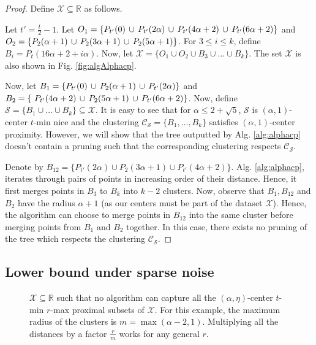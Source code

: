 \documentclass[anon,12pt]{colt2016} %
\newcommand{\mc}{\mathcal}
\begin{document}
\begin{proof}
Define $\mc X \subseteq \mathbb{R}$ as follows. 

Let $t' = \frac{t}{2}-1$. Let $O_1 = \{P_{t'}(0) \thinspace\cup\thinspace P_{t'}(2\alpha) \thinspace\cup\thinspace P_{t'}(4\alpha+2) \thinspace\cup\thinspace P_{t'}(6\alpha+2)\}$ and $O_2 = \{P_{2}(\alpha+1) \thinspace\cup\thinspace P_{2}(3\alpha+1) \thinspace\cup\thinspace P_{2}(5\alpha+1) \}$. For $3\le i\le k$, define $B_i = P_t (16\alpha+2+i \alpha )$. Now, let $\mc X = \{ O_1 \cup O_2 \cup B_3 \cup \ldots \cup B_k \}$. The set $\mc X$ is also shown in Fig. \ref{fig:algAlphacp}.

Now, let $B_1 = \{P_{t'}(0) \thinspace\cup\thinspace  P_{2}(\alpha+1) \thinspace\cup\thinspace P_{t'}(2\alpha) \}$ and $B_2 = \{\ P_{t'}(4\alpha+2) \thinspace\cup\thinspace P_{2}(5\alpha+1)\thinspace\cup\thinspace P_{t'}(6\alpha+2)\}$. Now, define $\mc S = \{B_1 \cup \ldots \cup B_k\} \subseteq \mc X$. It is easy to see that for $\alpha \le 2+\sqrt{5}$, $\mc S$ is $(\alpha, 1)$-center $t$-min nice and the clustering $\mc C_{\mc S} = \{B_1, \ldots, B_k\}$ satisfies $(\alpha, 1)$-center proximity. However, we will show that the tree outputted by Alg. \ref{alg:alphacp} doesn't contain a pruning such that the corresponding clustering respects $\mc C_{\mc S}$.

Denote by $B_{12} = \{P_{t'}(2\alpha) \cup P_{2}(3\alpha+1) \cup P_{t'}(4\alpha+2) \}$. Alg. \ref{alg:alphacp}, iterates through pairs of points in increasing order of their distance. Hence, it first merges points in $B_3$ to $B_k$ into $k-2$ clusters. Now, observe that $B_1, B_{12}$ and $B_{2}$ have the radius $\alpha + 1$ (as our centers must be part of the dataset $\mc X$). Hence, the algorithm can choose to merge points in $B_{12}$ into the same cluster before merging points from $B_1$ and $B_2$ together. In this case, there exists no pruning of the tree which respects the clustering $\mc C_{\mc S}$.
\end{proof}

\subsection{Lower bound under sparse noise}
\label{section:alphaLowerBoundSparse}

\begin{figure}

\caption{$\mc X \subseteq \mathbb{R}$ such that no algorithm can capture all the $(\alpha, \eta)$-center $t$-min $r$-max proximal subsets of $\mc X$. For this example, the maximum radius of the clusters is $m = \max(\alpha-2, 1)$. Multiplying all the distances by a factor $\frac{r}{m}$ works for any general $r$.}
\label{fig:noalgalphacp}
\end{figure}
\end{document}
